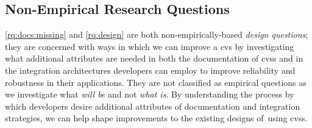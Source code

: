 
\subsection{Non-Empirical Research Questions}
\label{ssec:research-methodology:research-questions:nonempirical}

\ref{rq:docs:missing} and \ref{rq:design} are both non-empirically-based \textit{design questions}; they are concerned with ways in which we can improve a \gls{cvs} by investigating what additional attributes are needed in both the documentation of \glspl{cvs} and in the integration architectures developers can employ to improve reliability and robustness in their applications. They are not classified as empirical questions as we investigate what \textit{will be} and not \textit{what is}. By understanding the process by which developers desire additional attributes of documentation and integration strategies, we can help shape improvements to the existing designs of using \glspl{cvs}.